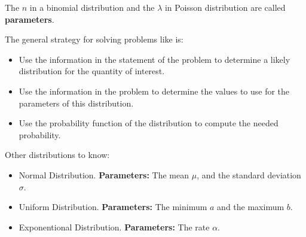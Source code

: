 %
\begin{frame}
The $n$ in a binomial distribution and the $\lambda$ in Poisson distribution are
called \textbf{parameters}.

The general strategy for solving problems like is:

\begin{itemize}
\item Use the information in the statement of the problem to determine a likely
distribution for the quantity of interest.
\item Use the information in the problem to determine the values to use for the
parameters of this distribution.
\item Use the probability function of the distribution to compute the needed
probability.
\end{itemize}

\end{frame}
%

%
\begin{frame}

Other distributions to know:

\begin{itemize}
\item Normal Distribution.  \textbf{Parameters:} The mean $\mu$, and the
standard deviation $\sigma$.
\item Uniform Distribution. \textbf{Parameters:} The minimum $a$ and the maximum
$b$.
\item Exponentional Distribution. \textbf{Parameters:} The rate $\alpha$.
\end{itemize}

\end{frame}
